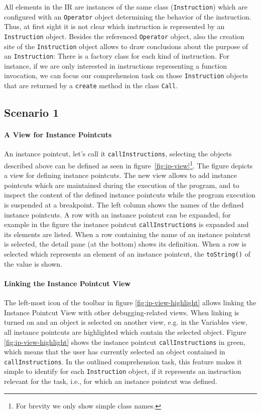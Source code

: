 \documentclass{sig-alternate}
\begin{document}
All elements in the IR are instances of the same class (\lstinline!Instruction!) which are configured with an \lstinline!Operator! object determining the behavior of the instruction.
Thus, at first sight it is not clear which instruction is represented by an \lstinline!Instruction! object.
Besides the referenced \lstinline!Operator! object, also the creation site of the \lstinline!Instruction! object allows to draw conclusions about the purpose of an \lstinline!Instruction!: There is a factory class for each kind of instruction.
For instance, if we are only interested in instructions representing a function invocation, we can focus our comprehension task on those \lstinline!Instruction! objects that are returned by a \lstinline!create! method in the class \lstinline!Call!.

\subsection{Scenario 1}
\label{sec:scenario-1}

\paragraph{A View for Instance Pointcuts}

An instance pointcut, let's call it \lstinline!callInstructions!, selecting the objects described above can be defined as seen in figure~\ref{fig:ip-view}\footnote{For brevity we only show simple class names.}.
The figure depicts a view for defining instance pointcuts.
The new view allows to add instance pointcuts which are maintained during the execution of the program, and to inspect the content of the defined instance pointcuts while the program execution is suspended at a breakpoint.
The left column shows the names of the defined instance pointcuts.
A row with an instance pointcut can be expanded, for example in the figure the instance pointcut \lstinline!callInstructions! is expanded and its elements are listed.
When a row containing the name of an instance pointcut is selected, the detail pane (at the bottom) shows its definition.
When a row is selected which represents an element of an instance pointcut, the \lstinline!toString()! of the value is shown.

\paragraph{Linking the Instance Pointcut View}

The left-most icon of the toolbar in figure \ref{fig:ip-view-highlight} allows linking the Instance Pointcut View with other debugging-related views.
When linking is turned on and an object is selected on another view, e.g. in the Variables view, all instance pointcuts are highlighted which contain the selected object.
Figure \ref{fig:ip-view-highlight} shows the instance pointcut \lstinline!callInstructions! in green, which means that the user has currently selected an object contained in \lstinline!callInstructions!.
In the outlined comprehension task, this feature makes it simple to identify for each \lstinline!Instruction! object, if it represents an instruction relevant for the task, i.e., for which an instance pointcut was defined.
\end{document}
